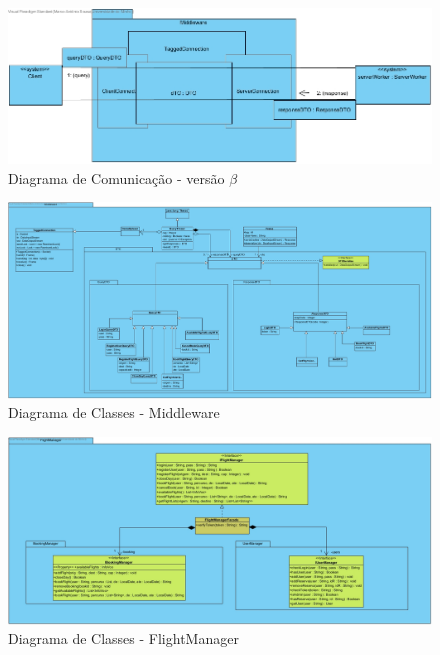 \documentclass[a4paper,11pt]{scrreprt}
\begin{document}
\begin{figure}[!ht]
    \centering
    \includegraphics[width=\linewidth]{diagramas/MiddlewareCommunicationDiagram.jpg}
    \caption{Diagrama de Comunicação - versão $\beta$} \label{img:comunicacao}
\end{figure}

\begin{landscape}
\begin{figure}[!ht]
    \centering
    \includegraphics[width=\linewidth]{diagramas/MiddlewareClassDiagram.jpg}
    \caption{Diagrama de Classes - Middleware} \label{img:middleware}
\end{figure}
\end{landscape}

\begin{landscape}
\begin{figure}[!ht]
    \centering
    \includegraphics[width=\linewidth]{diagramas/FlightManager.jpg}
    \caption{Diagrama de Classes - FlightManager} \label{img:flight_manager}
\end{figure}
\end{landscape}
\end{document}
